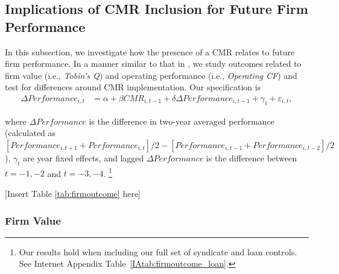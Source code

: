 \documentclass[a4paper,12pt]{article}
\begin{document}
\subsection{Implications of CMR Inclusion for Future Firm Performance}
\label{section:Performance}

In this subsection, we investigate how the presence of a CMR relates to future firm performance.
In a manner similar to that in \citet{Nini_2009}, we study outcomes related to firm value (i.e., \textit{Tobin's Q}) and operating performance (i.e., \textit{Operating CF}) and test for differences around CMR implementation.
Our specification is
\begin{align}
\Delta Performance_{i,t} &= \alpha + \beta CMR_{i,t-1} + \delta \Delta Performance_{i,t-1} + \gamma_t + \varepsilon_{i,t},
\end{align}%

\noindent
where $\Delta Performance$ is the difference in two-year averaged performance (calculated as $[Performance_{i,t+1} + Performance_{i,t}]/2 - [Performance_{i,t-1} + Performance_{i,t-2}]/2$), $ \gamma_t $ are year fixed effects, and lagged $\Delta Performance$ is the difference between $t=-1,-2$ and $t=-3,-4$.%
    \footnote{Our results hold when including our full set of syndicate and loan controls. See Internet Appendix Table~\ref{IAtab:firmoutcome_loan}.}


\begin{center}
  [Insert Table \ref{tab:firmoutcome} here]
\end{center}


\subsubsection{Firm Value}
\end{document}
